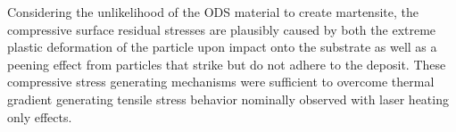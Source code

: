 	
	Considering the unlikelihood of the ODS material to create martensite, the compressive surface residual stresses are plausibly caused by both the extreme plastic deformation of the particle upon impact onto the substrate as well as a peening effect from particles that strike but do not adhere to the deposit. These compressive stress generating mechanisms were sufficient to overcome thermal gradient generating tensile stress behavior nominally observed with laser heating only effects. 
